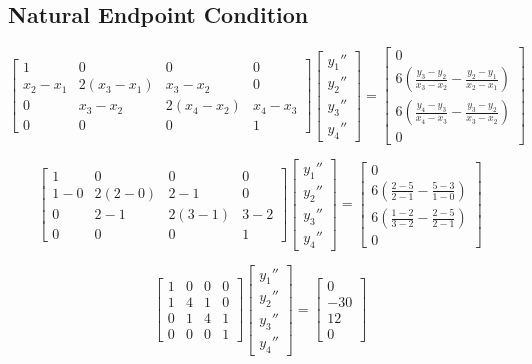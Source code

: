 \documentclass[11pt]{article} %
\begin{document}
\subsection*{Natural Endpoint Condition} 
$$\begin{bmatrix} 1 & 0 & 0 & 0 \\ x_2 - x_1 & 2(x_3 - x_1) & x_3 - x_2 & 0 
		 \\ 0 & x_3 - x_2 & 2(x_4 - x_2) & x_4 - x_3 \\ 0 & 0 & 0 & 1
\end{bmatrix}
\begin{bmatrix} y_1'' \\ y_2'' \\ y_3'' \\ y_4'' \end{bmatrix} = 
\begin{bmatrix} 0 \\ 6\left( \frac{y_3 - y_2}{x_3 - x_2} - \frac{y_2-y_1}{x_2 - x_1} \right) \\ 
			 6\left( \frac{y_4 - y_3}{x_4 - x_3} - \frac{y_3-y_2}{x_3 - x_2} \right) \\ 0\end{bmatrix}$$

$$\begin{bmatrix} 1 & 0 & 0 & 0 \\ 1 - 0 & 2(2 -0) &2 -1 & 0 
		 \\ 0 & 2 - 1 & 2(3 -1) & 3 - 2 \\ 0 & 0 & 0 & 1
\end{bmatrix}
\begin{bmatrix} y_1'' \\ y_2'' \\ y_3'' \\ y_4'' \end{bmatrix} = 
\begin{bmatrix} 0 \\  6\left( \frac{2 - 5}{2 - 1} - \frac{5-3}{1 - 0} \right) \\ 
			 6\left( \frac{1 - 2}{3 - 2} - \frac{2-5}{2 - 1} \right) \\ 0\end{bmatrix}$$

$$\begin{bmatrix} 1 & 0 & 0 & 0 \\ 1 & 4 &1 & 0 
		 \\ 0 & 1 & 4 & 1 \\ 0 & 0 & 0 & 1
\end{bmatrix}
\begin{bmatrix} y_1'' \\ y_2'' \\ y_3'' \\ y_4'' \end{bmatrix} = 
\begin{bmatrix} 0 \\ -30 \\ 12 \\ 0\end{bmatrix}$$
\end{document}
